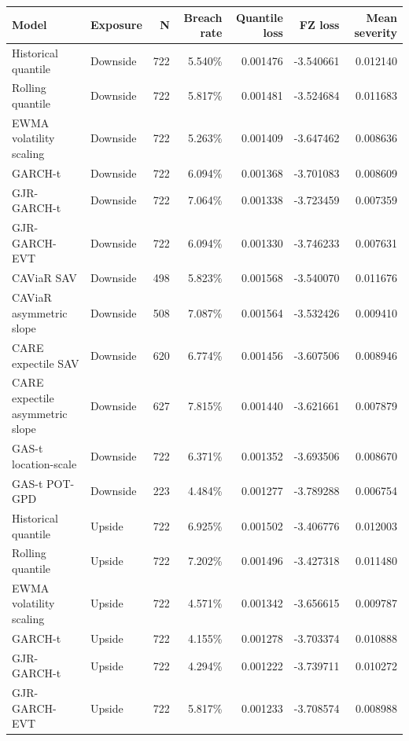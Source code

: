 \begin{tabular}{llrrrrr}
\toprule
Model & Exposure & N & Breach rate & Quantile loss & FZ loss & Mean severity \\
\midrule
Historical quantile & Downside & 722 & 5.540\% & 0.001476 & -3.540661 & 0.012140 \\
Rolling quantile & Downside & 722 & 5.817\% & 0.001481 & -3.524684 & 0.011683 \\
EWMA volatility scaling & Downside & 722 & 5.263\% & 0.001409 & -3.647462 & 0.008636 \\
GARCH-t & Downside & 722 & 6.094\% & 0.001368 & -3.701083 & 0.008609 \\
GJR-GARCH-t & Downside & 722 & 7.064\% & 0.001338 & -3.723459 & 0.007359 \\
GJR-GARCH-EVT & Downside & 722 & 6.094\% & 0.001330 & -3.746233 & 0.007631 \\
CAViaR SAV & Downside & 498 & 5.823\% & 0.001568 & -3.540070 & 0.011676 \\
CAViaR asymmetric slope & Downside & 508 & 7.087\% & 0.001564 & -3.532426 & 0.009410 \\
CARE expectile SAV & Downside & 620 & 6.774\% & 0.001456 & -3.607506 & 0.008946 \\
CARE expectile asymmetric slope & Downside & 627 & 7.815\% & 0.001440 & -3.621661 & 0.007879 \\
GAS-t location-scale & Downside & 722 & 6.371\% & 0.001352 & -3.693506 & 0.008670 \\
GAS-t POT-GPD & Downside & 223 & 4.484\% & 0.001277 & -3.789288 & 0.006754 \\
\midrule
Historical quantile & Upside & 722 & 6.925\% & 0.001502 & -3.406776 & 0.012003 \\
Rolling quantile & Upside & 722 & 7.202\% & 0.001496 & -3.427318 & 0.011480 \\
EWMA volatility scaling & Upside & 722 & 4.571\% & 0.001342 & -3.656615 & 0.009787 \\
GARCH-t & Upside & 722 & 4.155\% & 0.001278 & -3.703374 & 0.010888 \\
GJR-GARCH-t & Upside & 722 & 4.294\% & 0.001222 & -3.739711 & 0.010272 \\
GJR-GARCH-EVT & Upside & 722 & 5.817\% & 0.001233 & -3.708574 & 0.008988 \\

\end{tabular}
